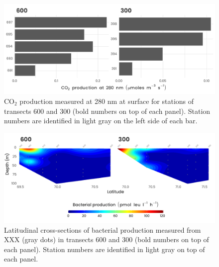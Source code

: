 \documentclass[essd, manuscript]{copernicus}
\begin{document}
\clearpage

\begin{figure}[H]
	\centering
	\includegraphics[scale = 1]{../../../graphs/fig09.pdf}
	\caption{CO$_2$ production measured at 280 nm at surface for stations of transects 600 and 300 (bold numbers on top of each panel). Station numbers are identified in light gray on the left side of each bar.}
\end{figure}

\clearpage

\begin{figure}[H]
	\centering
	\includegraphics[scale = 1]{../../../graphs/fig10.pdf}
	\caption{Latitudinal cross-sections of bacterial production measured from XXX (gray dots) in transects 600 and 300 (bold numbers on top of each panel). Station numbers are identified in light gray on top of each panel.}
\end{figure}



\appendix
\end{document}

